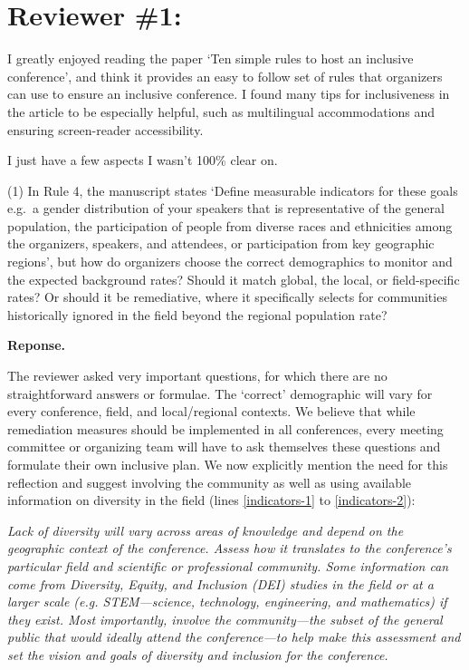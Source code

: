 \documentclass{article}
\newenvironment{Reply}{\noindent\color{BlueViolet}\textbf{Reponse.}}{\vspace{1em}}
\begin{document}
\section*{Reviewer \#1:}
I greatly enjoyed reading the paper `Ten simple rules to host an inclusive conference', and think it provides an easy to follow set of rules that organizers can use to ensure an inclusive conference. I found many tips for inclusiveness in the article to be especially helpful, such as multilingual accommodations and ensuring screen-reader accessibility.

I just have a few aspects I wasn't 100\% clear on.

(1) In Rule 4, the manuscript states `Define measurable indicators for these goals e.g.\ a gender distribution of your speakers that is representative of the general population, the participation of people from diverse races and ethnicities among the organizers, speakers, and attendees, or participation from key geographic regions', but how do organizers choose the correct demographics to monitor and the expected background rates? Should it match global, the local, or field-specific rates? Or should it be remediative, where it specifically selects for communities historically ignored in the field beyond the regional population rate?

\begin{Reply}

   The reviewer asked very important questions, for which there are no straightforward answers or formulae. 
   The `correct' demographic will vary for every conference, field, and local/regional contexts. 
   We believe that while remediation measures should be implemented in all conferences, every meeting committee or organizing team will have to ask themselves these questions and formulate their own inclusive plan.
   We now explicitly mention the need for this reflection and suggest involving the community as well as using available information on diversity in the field (lines \ref{indicators-1} to \ref{indicators-2}):
   
   \textit{
    Lack of diversity will vary across areas of knowledge and depend on the geographic context of the conference.
    Assess how it translates to the conference's particular field and scientific or professional community.
    Some information can come from Diversity, Equity, and Inclusion (DEI) studies in the field or at a larger scale (e.g. STEM---science, technology, engineering, and mathematics) if they exist. 
    Most importantly, involve the community---the subset of the general public that would ideally attend the conference---to help make this assessment and set the vision and goals of diversity and inclusion for the conference.
    }
   
\end{Reply}
\end{document}
